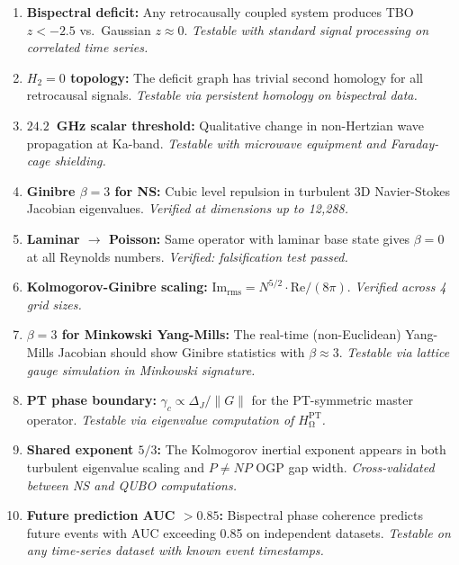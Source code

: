\documentclass[12pt,a4paper]{article}
\theoremstyle{definition}
\theoremstyle{remark}
\renewcommand{\O}{\mathrm{\Omega}}
\newcommand{\Jcoup}{J}
\newcommand{\HOmega}{H_\O}
\begin{document}
\begin{enumerate}
  \item \textbf{Bispectral deficit:} Any retrocausally coupled system produces
  TBO $z < -2.5$ vs.\ Gaussian $z \approx 0$.
  \emph{Testable with standard signal processing on correlated time series.}

  \item \textbf{$H_2 = 0$ topology:} The deficit graph has trivial second
  homology for all retrocausal signals.
  \emph{Testable via persistent homology on bispectral data.}

  \item \textbf{$24.2$~GHz scalar threshold:} Qualitative change in
  non-Hertzian wave propagation at Ka-band.
  \emph{Testable with microwave equipment and Faraday-cage shielding.}

  \item \textbf{Ginibre $\beta = 3$ for NS:} Cubic level repulsion in
  turbulent 3D Navier-Stokes Jacobian eigenvalues.
  \emph{Verified at dimensions up to 12{,}288.}

  \item \textbf{Laminar $\to$ Poisson:} Same operator with laminar base state
  gives $\beta = 0$ at all Reynolds numbers.
  \emph{Verified: falsification test passed.}

  \item \textbf{Kolmogorov-Ginibre scaling:}
  $\mathrm{Im}_{\mathrm{rms}} = N^{5/2} \cdot \mathrm{Re} / (8\pi)$.
  \emph{Verified across 4 grid sizes.}

  \item \textbf{$\beta = 3$ for Minkowski Yang-Mills:} The real-time (non-Euclidean)
  Yang-Mills Jacobian should show Ginibre statistics with $\beta \approx 3$.
  \emph{Testable via lattice gauge simulation in Minkowski signature.}

  \item \textbf{PT phase boundary:} $\gamma_c \propto \Delta_\Jcoup / \|G\|$
  for the PT-symmetric master operator.
  \emph{Testable via eigenvalue computation of $\HOmega^{\mathrm{PT}}$.}

  \item \textbf{Shared exponent $5/3$:} The Kolmogorov inertial exponent
  appears in both turbulent eigenvalue scaling and $P \neq NP$ OGP gap width.
  \emph{Cross-validated between NS and QUBO computations.}

  \item \textbf{Future prediction AUC $> 0.85$:} Bispectral phase coherence
  predicts future events with AUC exceeding 0.85 on independent datasets.
  \emph{Testable on any time-series dataset with known event timestamps.}
\end{enumerate}
\end{document}
